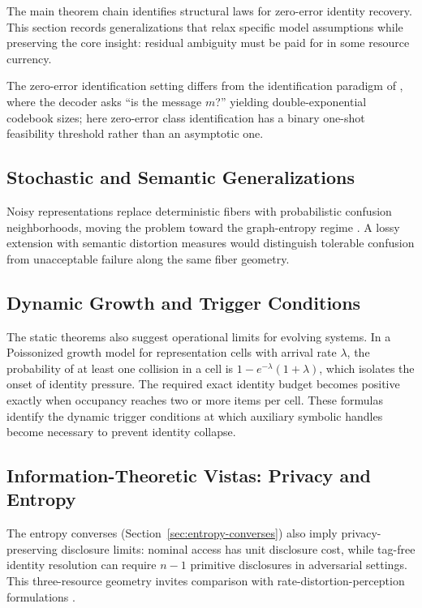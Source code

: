 The main theorem chain identifies structural laws for zero-error identity recovery. This section records generalizations that relax specific model assumptions while preserving the core insight: residual ambiguity must be paid for in some resource currency.

The zero-error identification setting differs from the identification paradigm of \cite{ahlswede1989identification}, where the decoder asks ``is the message $m$?'' yielding double-exponential codebook sizes; here zero-error class identification has a binary one-shot feasibility threshold rather than an asymptotic one.

\subsection{Stochastic and Semantic Generalizations}

Noisy representations replace deterministic fibers with probabilistic confusion neighborhoods, moving the problem toward the graph-entropy regime \cite{korner1973coding}. A lossy extension with semantic distortion measures would distinguish tolerable confusion from unacceptable failure along the same fiber geometry.

\subsection{Dynamic Growth and Trigger Conditions}

The static theorems also suggest operational limits for evolving systems. In a Poissonized growth model for representation cells with arrival rate $\lambda$, the probability of at least one collision in a cell is $1 - e^{-\lambda}(1+\lambda)$, which isolates the onset of identity pressure. The required exact identity budget becomes positive exactly when occupancy reaches two or more items per cell. These formulas identify the dynamic trigger conditions at which auxiliary symbolic handles become necessary to prevent identity collapse. 

\subsection{Information-Theoretic Vistas: Privacy and Entropy}

The entropy converses (Section~\ref{sec:entropy-converses}) also imply privacy-preserving disclosure limits: nominal access has unit disclosure cost, while tag-free identity resolution can require $n-1$ primitive disclosures in adversarial settings.  This three-resource geometry invites comparison with rate-distortion-perception formulations \cite{blau2019rethinking}.

